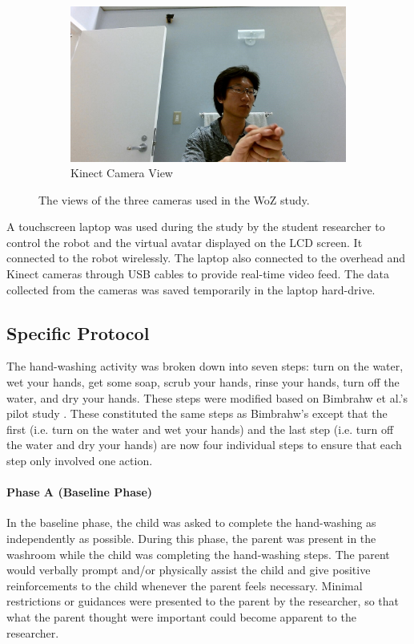 \begin{figure}[H]
	
	\begin{subfigure}[b]{0.49\textwidth}
		\includegraphics[width=1.1\linewidth]{./img/kinect_view}
		\caption{Kinect Camera View}
	\end{subfigure}%
	
	\caption{The views of the three cameras used in the WoZ study.}
	\label{fig:CameraViews}
\end{figure}


A touchscreen laptop was used during the study by the student researcher to control the robot and the virtual avatar displayed on the LCD screen. It connected to the robot wirelessly. The laptop also connected to the overhead and Kinect cameras through USB cables to provide real-time video feed. The data collected from the cameras was saved temporarily in the laptop hard-drive.

\subsection{Specific Protocol}
\label{sec:SpecificProtocol}
The hand-washing activity was broken down into seven steps: turn on the water, wet your hands, get some soap, scrub your hands, rinse your hands, turn off the water, and dry your hands.  These steps were modified based on Bimbrahw et al.'s pilot study \cite{bimbrahw2012investigating}. These constituted the same steps as Bimbrahw's except that the first (i.e. turn on the water and wet your hands) and the last step (i.e. turn off the water and dry your hands) are now four individual steps to ensure that each step only involved one action.

\paragraph{Phase A (Baseline Phase)}
In the baseline phase, the child was asked to complete the hand-washing as independently as possible. During this phase, the parent was present in the washroom while the child was completing the hand-washing steps. The parent would verbally prompt and/or physically assist the child and give positive reinforcements to the child whenever the parent feels necessary.  Minimal restrictions or guidances were presented to the parent by the researcher, so that what the parent thought were important could become apparent to the researcher.

